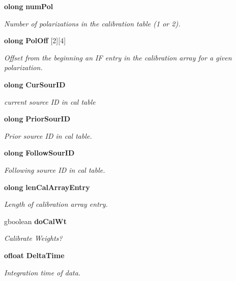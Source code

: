 \begin{CompactItemize}
{\bf olong} {\bf num\-Pol}
\begin{CompactList}\small\item\em Number of polarizations in the calibration table (1 or 2). \item\end{CompactList}\item 
{\bf olong} {\bf Pol\-Off} [2][4]
\begin{CompactList}\small\item\em Offset from the beginning an IF entry in the calibration array for a given polarization. \item\end{CompactList}\item 
{\bf olong} {\bf Cur\-Sour\-ID}
\begin{CompactList}\small\item\em current source ID in cal table \item\end{CompactList}\item 
{\bf olong} {\bf Prior\-Sour\-ID}
\begin{CompactList}\small\item\em Prior source ID in cal table. \item\end{CompactList}\item 
{\bf olong} {\bf Follow\-Sour\-ID}
\begin{CompactList}\small\item\em Following source ID in cal table. \item\end{CompactList}\item 
{\bf olong} {\bf len\-Cal\-Array\-Entry}
\begin{CompactList}\small\item\em Length of calibration array entry. \item\end{CompactList}\item 
gboolean {\bf do\-Cal\-Wt}
\begin{CompactList}\small\item\em Calibrate Weights? \item\end{CompactList}\item 
{\bf ofloat} {\bf Delta\-Time}
\begin{CompactList}\small\item\em Integration time of data. \item\end{CompactList}\item 

\end{CompactItemize}
